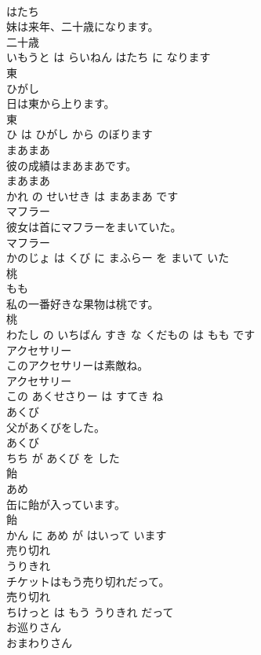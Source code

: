 \documentclass[8pt]{extreport}
\begin{document}
\begin{CJK}{UTF8}{min}
\\	はたち			
\\	妹は来年、二十歳になります。	
\\	二十歳 
\\	いもうと は らいねん はたち に なります			
\\	東	
\\	ひがし			
\\	日は東から上ります。	
\\	東 
\\	ひ は ひがし から のぼります			
\\	まあまあ	
\\	彼の成績はまあまあです。	
\\	まあまあ 
\\	かれ の せいせき は まあまあ です			
\\	マフラー	
\\	彼女は首にマフラーをまいていた。	
\\	マフラー 
\\	かのじょ は くび に まふらー を まいて いた			
\\	桃	
\\	もも			
\\	私の一番好きな果物は桃です。	
\\	桃 
\\	わたし の いちばん すき な くだもの は もも です			
\\	アクセサリー	
\\	このアクセサリーは素敵ね。	
\\	アクセサリー 
\\	この あくせさりー は すてき ね			
\\	あくび	
\\	父があくびをした。	
\\	あくび 
\\	ちち が あくび を した			
\\	飴	
\\	あめ			
\\	缶に飴が入っています。	
\\	飴 
\\	かん に あめ が はいって います			
\\	売り切れ	
\\	うりきれ			
\\	チケットはもう売り切れだって。	
\\	売り切れ 
\\	ちけっと は もう うりきれ だって			
\\	お巡りさん	
\\	おまわりさん			

\end{CJK}
\end{document}
